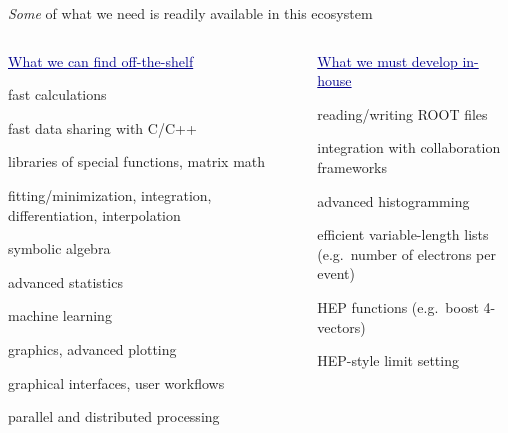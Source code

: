 \documentclass[aspectratio=169]{beamer}
\begin{document}
\begin{frame}{{\it Some} of what we need is readily available in this ecosystem}
\vspace{-0.5 cm}
\begin{columns}[t]
\begin{center}
\textcolor{darkblue}{\underline{\large What we can find off-the-shelf}}

\vspace{0.175 cm}
fast calculations

\vspace{0.175 cm}
fast data sharing with C/C++

\vspace{0.175 cm}
libraries of special functions, matrix math

\vspace{0.175 cm}
fitting/minimization, integration, differentiation, interpolation

\vspace{0.175 cm}
symbolic algebra

\vspace{0.175 cm}
advanced statistics

\vspace{0.175 cm}
machine learning

\vspace{0.175 cm}
graphics, advanced plotting

\vspace{0.175 cm}
graphical interfaces, user workflows

\vspace{0.175 cm}
parallel and distributed processing
\end{center}

\begin{center}
\textcolor{darkblue}{\underline{\large What we must develop in-house}}

\vspace{0.175 cm}
reading/writing ROOT files

\vspace{0.175 cm}
integration with collaboration frameworks

\vspace{0.175 cm}
advanced histogramming

\vspace{0.175 cm}
efficient variable-length lists \\ (e.g.\ number of electrons per event)

\vspace{0.175 cm}
HEP functions (e.g.\ boost 4-vectors)

\vspace{0.175 cm}
HEP-style limit setting
\end{center}
\end{columns}
\end{frame}
\end{document}
